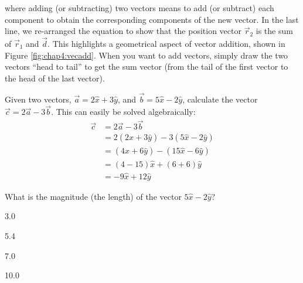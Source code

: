 where adding (or subtracting) two vectors means to add (or subtract) each component to obtain the corresponding components of the new vector. In the last line, we re-arranged the equation to show that the position vector $\vec r_2$ is the sum of $\vec r_1$ and $\vec d$. This highlights a geometrical aspect of vector addition, shown in Figure \ref{fig:chap4:vecadd}. When you want to add vectors, simply draw the two vectors ``head to tail'' to get the sum vector (from the tail of the first vector to the head of the last vector).

\begin{example}{Given two vectors, $\vec a=2\hat x+3\hat y$, and $\vec b=5\hat x-2\hat y$, calculate the vector $\vec c= 2\vec a- 3\vec b$.}
This can easily be solved algebraically:
\begin{align*}
\vec c &= 2\vec a- 3\vec b\\
&=2 (2\hat x+3\hat y) - 3 (5\hat x-2\hat y) \\
&=(4\hat x+6\hat y)-(15\hat x-6\hat y) \\
&=(4-15)\hat x + (6+6) \hat y\\
&= -9 \hat x + 12 \hat y
\end{align*}
\end{example}

\begin{checkpointMC}{What is the magnitude (the length) of the vector $5\hat x-2\hat y$?}
\item 3.0
\item 5.4%
\item 7.0
\item 10.0
\end{checkpointMC}

